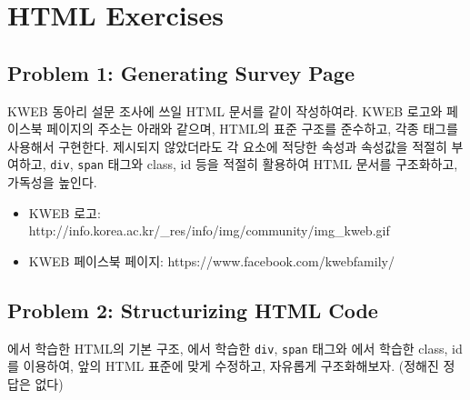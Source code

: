 \section{HTML Exercises} \label{sect:html-exercises}

\subsection*{Problem 1: Generating Survey Page}

KWEB 동아리 설문 조사에 쓰일 HTML 문서를 \와 같이 작성하여라. KWEB 로고와 페이스북 페이지의 주소는 아래와 같으며, HTML의 표준 구조를 준수하고, 각종 태그를 사용해서 구현한다. 제시되지 않았더라도 각 요소에 적당한 속성과 속성값을 적절히 부여하고, \texttt{div}, \texttt{span} 태그와 class, id 등을 적절히 활용하여 HTML 문서를 구조화하고, 가독성을 높인다.

\begin{itemize}
    \item KWEB 로고: http://info.korea.ac.kr/\_res/info/img/community/img\_kweb.gif
    \item KWEB 페이스북 페이지: https://www.facebook.com/kwebfamily/
\end{itemize}

    {}

\subsection*{Problem 2: Structurizing HTML Code}

에서 학습한 HTML의 기본 구조, 에서 학습한 \texttt{div}, \texttt{span} 태그와 에서 학습한 class, id를 이용하여, 앞의 \를 HTML 표준에 맞게 수정하고, 자유롭게 구조화해보자. (정해진 정답은 없다)

